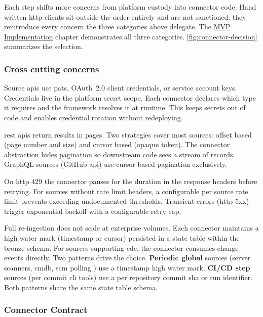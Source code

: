 Each step shifts more concerns from platform custody into connector code. Hand written \gls{http} clients sit outside the order entirely and are not sanctioned: they reintroduce every concern the three categories above delegate. The \hyperref[ch:implementation]{MVP Implementation} chapter demonstrates all three categories. \autoref{fig:connector-decision} summarizes the selection.



\subsubsection{Cross cutting concerns}

 Source \glspl{api} use \glspl{pat}, OAuth~2.0 client credentials, or service account keys. Credentials live in the platform secret scope. Each connector declares which type it requires and the framework resolves it at runtime. This keeps secrets out of code and enables credential rotation without redeploying.

 \Gls{rest} \glspl{api} return results in pages. Two strategies cover most sources: offset based (page number and size) and cursor based (opaque token). The connector abstraction hides pagination so downstream code sees a stream of records. GraphQL sources (GitHub \gls{api}) use cursor based pagination exclusively.

 On \gls{http} 429 the connector pauses for the duration in the response headers before retrying. For sources without rate limit headers, a configurable per source rate limit prevents exceeding undocumented thresholds. Transient errors (\gls{http} 5xx) trigger exponential backoff with a configurable retry cap.

 Full re-ingestion does not scale at enterprise volumes. Each connector maintains a high water mark (timestamp or cursor) persisted in a state table within the bronze schema. For sources supporting \gls{cdc}, the connector consumes change events directly. Two patterns drive the choice. \textbf{Periodic global} sources (server scanners, \gls{cmdb}, \gls{scm} polling ) use a timestamp high water mark. \textbf{CI/CD step} sources (per commit \gls{cli} tools) use a per repository commit \gls{sha} or run identifier. Both patterns share the same state table schema.

\subsubsection{Connector Contract}
\label{sec:connector-contract}

